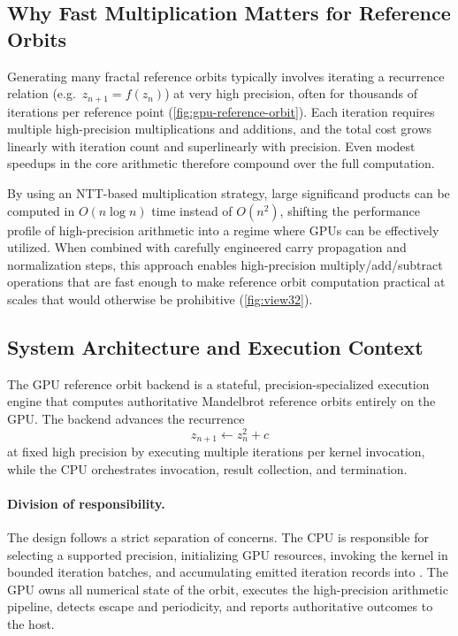 \subsection{Why Fast Multiplication Matters for Reference Orbits}

Generating many fractal reference orbits typically involves iterating a
recurrence relation (e.g.\ $z_{n+1} = f(z_n)$) at very high precision, often for
thousands of iterations per reference point
(\cref{fig:gpu-reference-orbit}). Each iteration requires multiple
high-precision multiplications and additions, and the total cost grows linearly
with iteration count and superlinearly with precision. Even modest speedups in
the core arithmetic therefore compound over the full computation.

By using an NTT-based multiplication strategy, large significand products can be
computed in $O(n \log n)$ time instead of $O(n^2)$, shifting the performance
profile of high-precision arithmetic into a regime where GPUs can be effectively
utilized. When combined with carefully engineered carry propagation and
normalization steps, this approach enables high-precision multiply/add/subtract
operations that are fast enough to make reference orbit computation practical at
scales that would otherwise be prohibitive (\cref{fig:view32}).

\subsection{System Architecture and Execution Context}
\label{subsec:ref-orbit-architecture}

The GPU reference orbit backend is a stateful, precision-specialized execution
engine that computes authoritative Mandelbrot reference orbits entirely on the
GPU. The backend advances the recurrence
\[
z_{n+1} \leftarrow z_n^2 + c
\]
at fixed high precision by executing multiple iterations per kernel invocation,
while the CPU orchestrates invocation, result collection, and termination.

\paragraph{Division of responsibility.}
The design follows a strict separation of concerns. The CPU is responsible for
selecting a supported precision, initializing GPU resources, invoking the kernel
in bounded iteration batches, and accumulating emitted iteration records into
. The GPU owns all numerical state of the orbit,
executes the high-precision arithmetic pipeline, detects escape and periodicity,
and reports authoritative outcomes to the host.

